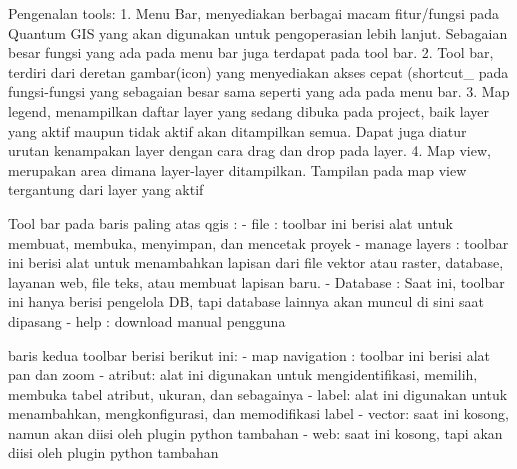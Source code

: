 Pengenalan tools:
1.	Menu Bar, menyediakan berbagai macam fitur/fungsi pada Quantum GIS yang akan digunakan untuk pengoperasian lebih lanjut. Sebagaian besar fungsi yang ada pada menu bar juga terdapat pada tool bar.
2.	Tool bar, terdiri dari deretan gambar(icon) yang menyediakan akses cepat (shortcut_ pada fungsi-fungsi yang sebagaian besar sama seperti yang ada pada menu bar.
3. Map legend, menampilkan daftar layer yang sedang dibuka pada project, baik layer yang aktif maupun tidak aktif akan ditampilkan semua. Dapat juga diatur urutan kenampakan layer dengan cara drag dan drop pada layer.
4. Map view, merupakan area dimana layer-layer ditampilkan. Tampilan pada map view tergantung dari layer yang aktif

Tool bar pada baris paling atas qgis :
- file : toolbar ini berisi alat untuk membuat, membuka, menyimpan, dan mencetak proyek
- manage layers : toolbar ini berisi alat untuk menambahkan lapisan dari file vektor atau raster, database, layanan web, file teks, atau membuat lapisan baru.
- Database : Saat ini, toolbar ini hanya berisi pengelola DB, tapi database lainnya akan muncul di sini saat dipasang
- help : download manual pengguna

baris kedua toolbar berisi berikut ini:
- map navigation : toolbar ini berisi alat pan dan zoom
- atribut: alat ini digunakan untuk mengidentifikasi, memilih, membuka tabel atribut, ukuran, dan sebagainya
- label: alat ini digunakan untuk menambahkan, mengkonfigurasi, dan memodifikasi label
- vector: saat ini kosong, namun akan diisi oleh plugin python tambahan
- web: saat ini kosong, tapi akan diisi oleh plugin python tambahan

